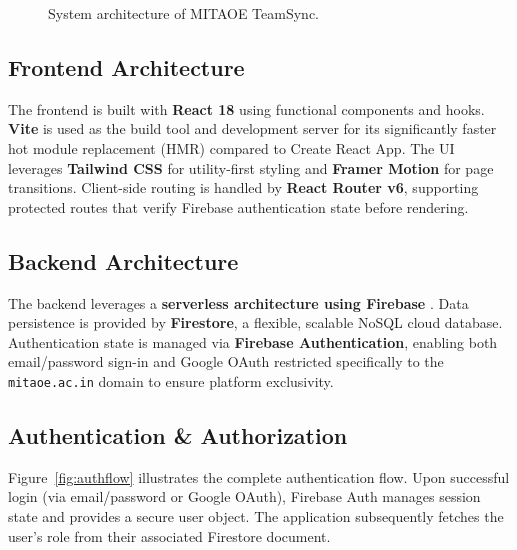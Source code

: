 \documentclass[conference]{IEEEtran}
\begin{document}
\begin{figure}[htbp]
\caption{System architecture of MITAOE TeamSync.}
\label{fig:architecture}
\end{figure}

\subsection{Frontend Architecture}
The frontend is built with \textbf{React 18} \cite{react2022} using functional components and hooks. \textbf{Vite} is used as the build tool and development server for its significantly faster hot module replacement (HMR) compared to Create React App. The UI leverages \textbf{Tailwind CSS} for utility-first styling and \textbf{Framer Motion} for page transitions. Client-side routing is handled by \textbf{React Router v6}, supporting protected routes that verify Firebase authentication state before rendering.

\subsection{Backend Architecture}
The backend leverages a \textbf{serverless architecture using Firebase} \cite{firebase2023}. Data persistence is provided by \textbf{Firestore}, a flexible, scalable NoSQL cloud database. Authentication state is managed via \textbf{Firebase Authentication}, enabling both email/password sign-in and Google OAuth restricted specifically to the \texttt{mitaoe.ac.in} domain to ensure platform exclusivity.

\subsection{Authentication \& Authorization}
Figure~\ref{fig:authflow} illustrates the complete authentication flow. Upon successful login (via email/password or Google OAuth), Firebase Auth manages session state and provides a secure user object. The application subsequently fetches the user's role from their associated Firestore document.
\end{document}
